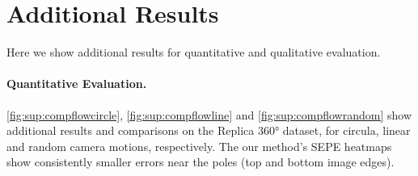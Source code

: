 \documentclass{bmvc2k}
\begin{document}
\section{Additional Results}

Here we show additional results for quantitative and qualitative evaluation.

\paragraph{Quantitative Evaluation.}

\cref{fig:sup:compflowcircle}, \cref{fig:sup:compflowline} and \cref{fig:sup:compflowrandom} show additional results and comparisons on the Replica 360° dataset, for circula, linear and random camera motions, respectively.
The our method's SEPE heatmaps show consistently smaller errors near the poles (top and bottom image edges).
\end{document}
